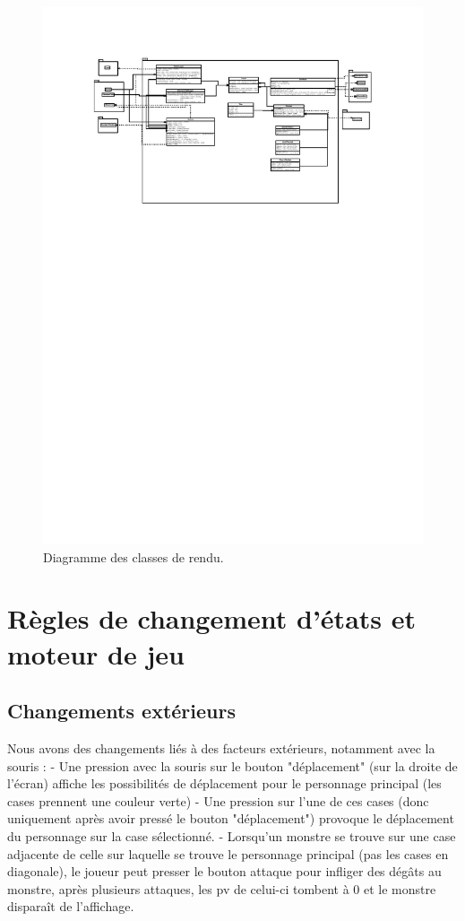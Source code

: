 \documentclass[a4paper,12pt]{article}
\begin{document}
\begin{landscape}
\begin{figure}[p]
\includegraphics[width=0.9\paperheight]{render.pdf}
\caption{\label{uml:render}Diagramme des classes de rendu.} 
\end{figure}
\end{landscape}

\clearpage
\section{Règles de changement d'états et moteur de jeu}

\subsection{Changements extérieurs}

Nous avons des changements liés à des facteurs extérieurs, notamment avec la souris : 
- Une pression avec la souris sur le bouton "déplacement" (sur la droite de l'écran) affiche les possibilités de déplacement pour le personnage principal (les cases prennent une couleur verte)
- Une pression sur l'une de ces cases (donc uniquement après avoir pressé le bouton "déplacement") provoque le déplacement du personnage sur la case sélectionné.
- Lorsqu'un monstre se trouve sur une case adjacente de celle sur laquelle se trouve le personnage principal (pas les cases en diagonale), le joueur peut presser le bouton attaque pour infliger des dégâts au monstre, après plusieurs attaques, les pv de celui-ci tombent à 0 et le monstre disparaît de l'affichage.
\end{document}
